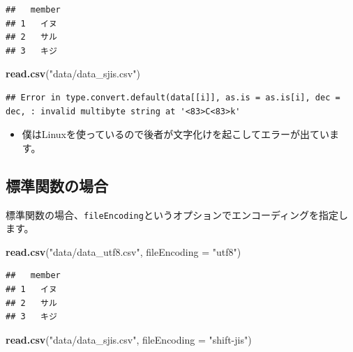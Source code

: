 \documentclass[]{bxjsreport}
\newenvironment{Shaded}{\begin{snugshade}}{\end{snugshade}}
\newcommand{\DataTypeTok}[1]{\textcolor[rgb]{0.13,0.29,0.53}{#1}}
\newcommand{\KeywordTok}[1]{\textcolor[rgb]{0.13,0.29,0.53}{\textbf{#1}}}
\newcommand{\NormalTok}[1]{#1}
\newcommand{\StringTok}[1]{\textcolor[rgb]{0.31,0.60,0.02}{#1}}
\providecommand{\tightlist}{%
  \setlength{\itemsep}{0pt}\setlength{\parskip}{0pt}}
\let\asdf\section
\renewcommand{\section}{\chapter}
\let\asdff\subsection
\renewcommand{\subsection}{\asdf}
\renewcommand{\subsubsection}{\asdff}
\begin{document}
\begin{verbatim}
##   member
## 1   イヌ
## 2   サル
## 3   キジ
\end{verbatim}

\begin{Shaded}
\begin{Highlighting}[]
\KeywordTok{read.csv}\NormalTok{(}\StringTok{"data/data_sjis.csv"}\NormalTok{)}
\end{Highlighting}
\end{Shaded}

\begin{verbatim}
## Error in type.convert.default(data[[i]], as.is = as.is[i], dec = dec, : invalid multibyte string at '<83>C<83>k'
\end{verbatim}

\begin{itemize}
\tightlist
\item
  僕はLinuxを使っているので後者が文字化けを起こしてエラーが出ています。
\end{itemize}

\hypertarget{ux6a19ux6e96ux95a2ux6570ux306eux5834ux5408}{%
\subsubsection{標準関数の場合}\label{ux6a19ux6e96ux95a2ux6570ux306eux5834ux5408}}

標準関数の場合、\texttt{fileEncoding}というオプションでエンコーディングを指定します。

\begin{Shaded}
\begin{Highlighting}[]
\KeywordTok{read.csv}\NormalTok{(}\StringTok{"data/data_utf8.csv"}\NormalTok{, }\DataTypeTok{fileEncoding =} \StringTok{"utf8"}\NormalTok{)}
\end{Highlighting}
\end{Shaded}

\begin{verbatim}
##   member
## 1   イヌ
## 2   サル
## 3   キジ
\end{verbatim}

\begin{Shaded}
\begin{Highlighting}[]
\KeywordTok{read.csv}\NormalTok{(}\StringTok{"data/data_sjis.csv"}\NormalTok{, }\DataTypeTok{fileEncoding =} \StringTok{"shift-jis"}\NormalTok{)}
\end{Highlighting}
\end{Shaded}
\end{document}
